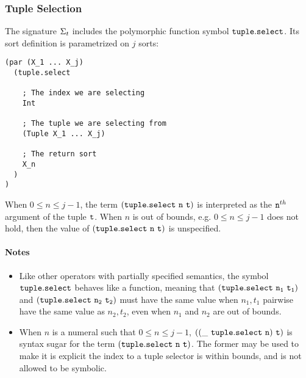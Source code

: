 \documentclass[english,a4paper,10pt]{article}
\begin{document}
\subsubsection{Tuple Selection}
The signature $\Sigma_{t}$ includes 
the polymorphic function symbol ${\tt tuple.select}$.
Its sort definition is parametrized on $j$ sorts:
\begin{verbatim}
(par (X_1 ... X_j) 
  (tuple.select
    
    ; The index we are selecting 
    Int
    
    ; The tuple we are selecting from
    (Tuple X_1 ... X_j)
    
    ; The return sort
    X_n
  )
)
\end{verbatim}
When $0 \leq n \leq j-1$,
the term $\syntax{(tuple.select\ n\ t)}$ is
interpreted as the ${\tt n}^{th}$ argument of the tuple ${\tt t}$.
When $n$ is out of bounds, e.g. $0 \leq n \leq j-1$ does not hold,
then the value of $\syntax{(tuple.select\ n\ t)}$ is unspecified.

\paragraph{Notes}
\begin{itemize}
\item Like other operators with partially specified semantics,
the symbol ${\tt tuple.select}$ behaves like a function, meaning
that ${\tt (tuple.select\ n_1\ t_1)}$ and  ${\tt (tuple.select\ n_2\ t_2)}$
must have the same value when $n_1, t_1$ pairwise have the same value as $n_2, t_2$,
even when $n_1$ and $n_2$ are out of bounds.
\item When $n$ is a numeral such that $0 \leq n \leq j-1$,
${\tt ((\_\ tuple.select\ n)\ t)}$ is syntax sugar for the term
$\syntax{(tuple.select\ n\ t)}$.
The former may be used to make it is explicit the index to a tuple selector
is within bounds, and is not allowed to be symbolic.
\end{itemize}
\end{document}
